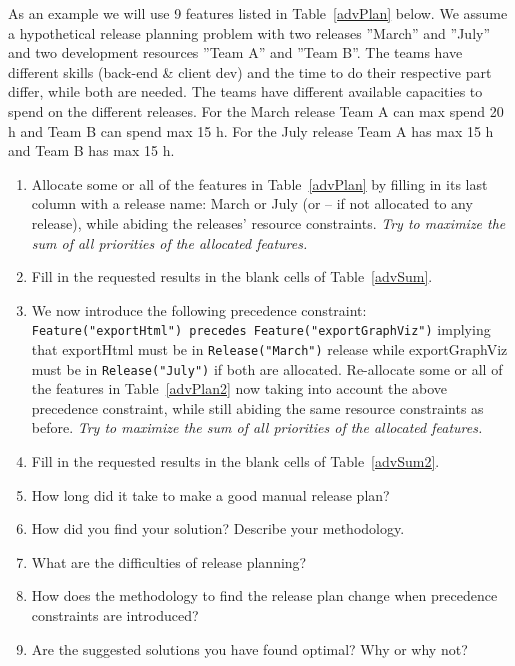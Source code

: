 \documentclass[11pt]{article}
\begin{document}
{\fontsize{9}{10}\begin{framed}
\noindent As an example we will use 9 features listed in Table~\ref{advPlan} below. We assume a hypothetical release planning problem with two releases ''March'' and  ''July'' and two development resources ''Team A''  and ''Team B''. The teams have different skills (back-end \& client dev) and  the time to do their respective part differ, while both are needed.
The teams have different available capacities to spend on the different releases. For the March release Team A can max spend 20 h and Team B can spend max 15 h. For the July release Team A has max 15 h and Team B has max 15 h.

\begin{enumerate}
\item Allocate some or all of the features in Table~\ref{advPlan} by filling in its last column with a release name: March or July (or -- if not allocated to any release), while abiding the releases' resource constraints. {\it Try to maximize the sum of all priorities of the allocated features.}
\item Fill in the requested results in the blank cells of  Table~\ref{advSum}.
\item We now introduce the following precedence constraint:\\ \verb+Feature("exportHtml") precedes Feature("exportGraphViz")+ implying that exportHtml must be in \verb+Release("March")+ release while exportGraphViz must be in \verb+Release("July")+ if both are allocated. Re-allocate some or all of the features in Table~\ref{advPlan2} now taking into account the above precedence constraint, while still abiding the same resource constraints as before. {\it Try to maximize the sum of all priorities of the allocated features.}
\item Fill in the requested results in the blank cells of  Table~\ref{advSum2}.
\item How long did it take to make a good manual release plan? \underline{\hspace{1.3cm}}
\item How did you find your solution? Describe your methodology.
\item What are the difficulties of release planning?
\item How does the methodology to find the release plan change when precedence constraints are introduced?
\item Are the suggested solutions you have found optimal? Why or why not?
\end{enumerate}
\end{framed}
}
\end{document}
